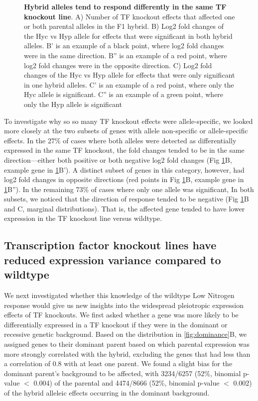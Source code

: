 \begin{figure}
     \caption{\textbf{Hybrid alleles tend to respond differently in the same TF knockout line}. A) Number of TF knockout effects that affected one or both parental alleles in the F1 hybrid. B) Log2 fold changes of the Hyc vs Hyp allele for effects that were significant in both hybrid alleles. B' is an example of a black point, where log2 fold changes were in the same direction. B'' is an example of a red point, where log2 fold changes were in the opposite direction. C) Log2 fold changes of the Hyc vs Hyp allele for effects that were only significant in one hybrid alleles. C' is an example of a red point, where only the Hyc allele is significant. C'' is an example of a green point, where only the Hyp allele is significant}
    \label{fig:alleleic}
\end{figure}

To investigate why so so many TF knockout effects were allele-specific, we looked more closely at the two subsets of genes with allele non-specific or allele-specific effects. In the 27\% of cases where both alleles were detected as differentially expressed in the same TF knockout, the fold changes tended to be in the same direction---either both positive or both negative log2 fold changes (Fig \ref{fig:alleleic}B, example gene in \ref{fig:alleleic}B'). A distinct subset of genes in this category, however, had log2 fold changes in opposite directions (red points in Fig \ref{fig:alleleic}B, example gene in \ref{fig:alleleic}B''). In the remaining 73\% of cases where only one allele was significant, In both subsets, we noticed that the direction of response tended to be negative (Fig \ref{fig:alleleic}B and C, marginal distributions). That is, the affected gene tended to have lower expression in the TF knockout line versus wildtype.

\subsection{Transcription factor knockout lines have reduced expression variance compared to wildtype}

We next investigated whether this knowledge of the wildtype Low Nitrogen response would give us new insights into the widespread pleiotropic expression effects of TF knockouts. We first asked whether a gene was more likely to be differentially expressed in a TF knockout if they were in the dominant or recessive genetic background. Based on the distribution in \ref{fig:dominance}B, we assigned genes to their dominant parent based on which parental expression was more strongly correlated with the hybrid, excluding the genes that had less than a correlation of 0.8 with at least one parent. We found a slight bias for the dominant parent's background to be affected, with 3234/6257 (52\%, binomial p-value $<$ 0.004) of the parental and 4474/8666 (52\%, binomial p-value $<$ 0.002) of the hybrid alleleic effects occurring in the dominant background.

